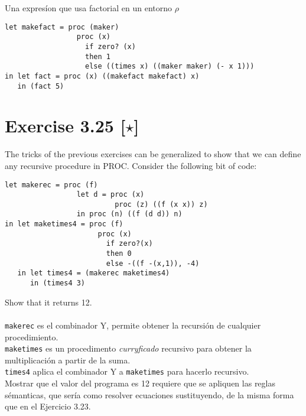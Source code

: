\documentclass[11pt]{article}
\begin{document}
Una expresíon que usa factorial en un entorno $\rho$                   
\begin{lstlisting}[mathescape]              
let makefact = proc (maker)
                 proc (x)
                   if zero? (x)
                   then 1
                   else ((times x) ((maker maker) (- x 1)))
in let fact = proc (x) ((makefact makefact) x)
   in (fact 5)                   
\end{lstlisting}

\section*{Exercise 3.25 [$\star $]}
The tricks of the previous exercises can be generalized to show that we can deﬁne any recursive procedure in PROC. Consider the following bit of code:

\begin{lstlisting}[mathescape]
let makerec = proc (f)
                 let d = proc (x)
                          proc (z) ((f (x x)) z)
                 in proc (n) ((f (d d)) n)
in let maketimes4 = proc (f)
                      proc (x)
                        if zero?(x)
                        then 0
                        else -((f -(x,1)), -4)
   in let times4 = (makerec maketimes4)
      in (times4 3)                        
\end{lstlisting}                 
Show that it returns 12. \\ \\

\noindent \verb|makerec| es el combinador Y, permite obtener la recursión de cualquier procedimiento. \\
\noindent \verb|maketimes| es un procedimento  \textit{curryficado} recursivo para obtener la multiplicación a partir de la suma.  \\
\noindent \verb|times4| aplica el combinador Y a \verb|maketimes| para hacerlo recursivo. \\

Mostrar que el valor del programa es 12 requiere que se apliquen las reglas sémanticas, que sería como resolver ecuaciones sustituyendo, de la misma forma que en el Ejercicio 3.23.
\end{document}
